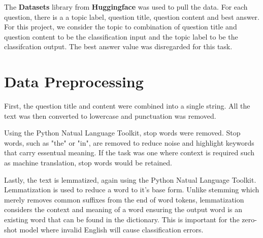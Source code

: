 \documentclass{article}
\begin{document}
The \textbf{Datasets} library from \textbf{Huggingface} was used to pull the data. For each question, there is a a topic label, question title, question content and best answer. For 
this project, we consider the topic to combination of question title and question content to be the classification input and the topic label to be the classifcation output. 
The best answer value was disregarded for this task.

\section{Data Preprocessing}

First, the question title and content were combined into a single string. 
All the text was then converted to lowercase and punctuation was removed.

Using the Python Natual Language Toolkit, stop words were removed. Stop words, such as "the" or "in", are removed to reduce noise and highlight keywords that carry essentual meaning.
If the task was one where context is required such as machine translation, stop words would be retained. 

Lastly, the text is lemmatized, again using the Python Natual Language Toolkit. Lemmatization is used to reduce a word to it's base form. Unlike stemming which merely removes common suffixes from the end of word tokens, lemmatization considers the context and meaning of a word
 ensuring the output word is an existing word that can be found in the dictionary. This is important for the zero-shot model where invalid English will cause classification errors.



\section{}



\end{document}
